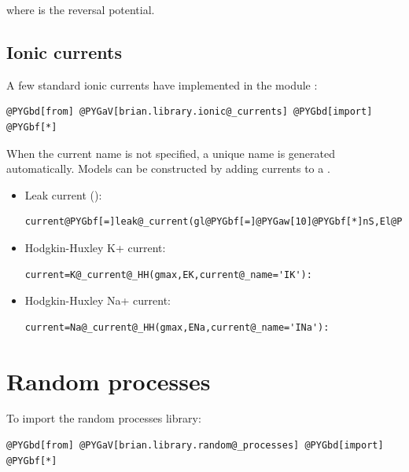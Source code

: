 \documentclass[letterpaper,10pt,english]{manual}
\begin{document}
where  is the reversal potential.


\subsection{Ionic currents}

A few standard ionic currents have implemented in the module :

\begin{Verbatim}[commandchars=@\[\]]
@PYGbd[from] @PYGaV[brian.library.ionic@_currents] @PYGbd[import] @PYGbf[*]
\end{Verbatim}

When the current name is not specified,
a unique name is generated automatically. Models can be constructed by adding currents to a
.
\begin{itemize}
\item {} 
Leak current ():

\begin{Verbatim}[commandchars=@\[\]]
current@PYGbf[=]leak@_current(gl@PYGbf[=]@PYGaw[10]@PYGbf[*]nS,El@PYGbf[=]@PYGbf[-]@PYGaw[70]@PYGbf[*]mV,current@_name@PYGbf[=]@PYGad[']@PYGad[I]@PYGad['])
\end{Verbatim}

\item {} 
Hodgkin-Huxley K+ current:

\begin{Verbatim}[commandchars=@\[\]]
current=K@_current@_HH(gmax,EK,current@_name='IK'):
\end{Verbatim}

\item {} 
Hodgkin-Huxley Na+ current:

\begin{Verbatim}[commandchars=@\[\]]
current=Na@_current@_HH(gmax,ENa,current@_name='INa'):
\end{Verbatim}

\end{itemize}

\resetcurrentobjects
\hypertarget{--doc-randomprocesses}{}

\section{Random processes}

To import the random processes library:

\begin{Verbatim}[commandchars=@\[\]]
@PYGbd[from] @PYGaV[brian.library.random@_processes] @PYGbd[import] @PYGbf[*]
\end{Verbatim}
\end{document}
